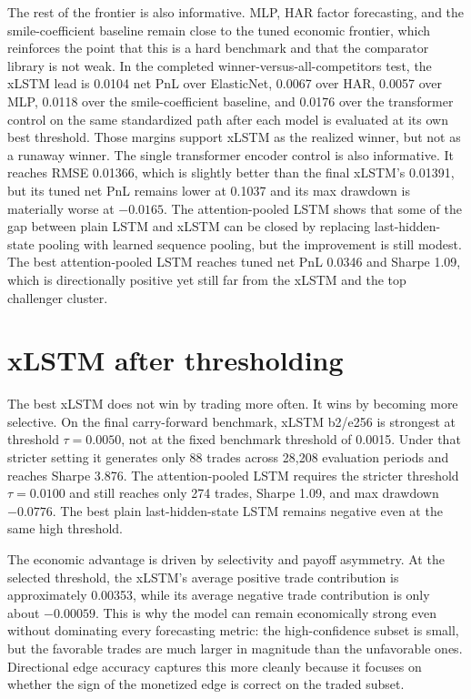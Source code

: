 \documentclass[12pt]{report}
\begin{document}
The rest of the frontier is also informative. MLP, HAR factor forecasting, and the smile-coefficient baseline remain close to the tuned economic frontier, which reinforces the point that this is a hard benchmark and that the comparator library is not weak. In the completed winner-versus-all-competitors test, the xLSTM lead is 0.0104 net PnL over ElasticNet, 0.0067 over HAR, 0.0057 over MLP, 0.0118 over the smile-coefficient baseline, and 0.0176 over the transformer control on the same standardized path after each model is evaluated at its own best threshold. Those margins support xLSTM as the realized winner, but not as a runaway winner. The single transformer encoder control is also informative. It reaches RMSE 0.01366, which is slightly better than the final xLSTM's 0.01391, but its tuned net PnL remains lower at 0.1037 and its max drawdown is materially worse at \(-0.0165\). The attention-pooled LSTM shows that some of the gap between plain LSTM and xLSTM can be closed by replacing last-hidden-state pooling with learned sequence pooling, but the improvement is still modest. The best attention-pooled LSTM reaches tuned net PnL 0.0346 and Sharpe 1.09, which is directionally positive yet still far from the xLSTM and the top challenger cluster.

\section{xLSTM after thresholding}
The best xLSTM does not win by trading more often. It wins by becoming more selective. On the final carry-forward benchmark, xLSTM b2/e256 is strongest at threshold \(\tau=0.0050\), not at the fixed benchmark threshold of 0.0015. Under that stricter setting it generates only 88 trades across 28,208 evaluation periods and reaches Sharpe 3.876. The attention-pooled LSTM requires the stricter threshold \(\tau=0.0100\) and still reaches only 274 trades, Sharpe 1.09, and max drawdown \(-0.0776\). The best plain last-hidden-state LSTM remains negative even at the same high threshold.

The economic advantage is driven by selectivity and payoff asymmetry. At the selected threshold, the xLSTM's average positive trade contribution is approximately 0.00353, while its average negative trade contribution is only about \(-0.00059\). This is why the model can remain economically strong even without dominating every forecasting metric: the high-confidence subset is small, but the favorable trades are much larger in magnitude than the unfavorable ones. Directional edge accuracy captures this more cleanly because it focuses on whether the sign of the monetized edge is correct on the traded subset.
\end{document}
